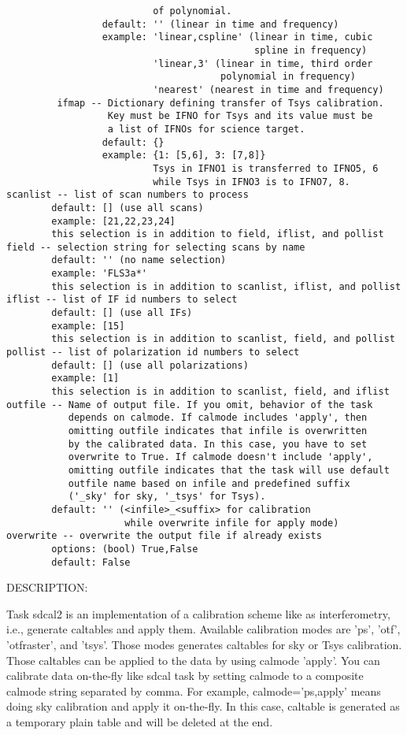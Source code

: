 \begin{verbatim}
                          of polynomial.
                 default: '' (linear in time and frequency)
                 example: 'linear,cspline' (linear in time, cubic 
                                            spline in frequency)
                          'linear,3' (linear in time, third order 
                                      polynomial in frequency)
                          'nearest' (nearest in time and frequency)
         ifmap -- Dictionary defining transfer of Tsys calibration. 
                  Key must be IFNO for Tsys and its value must be 
                  a list of IFNOs for science target.
                 default: {}
                 example: {1: [5,6], 3: [7,8]}
                          Tsys in IFNO1 is transferred to IFNO5, 6 
                          while Tsys in IFNO3 is to IFNO7, 8.
scanlist -- list of scan numbers to process
        default: [] (use all scans)
        example: [21,22,23,24]
        this selection is in addition to field, iflist, and pollist
field -- selection string for selecting scans by name
        default: '' (no name selection)
        example: 'FLS3a*'
        this selection is in addition to scanlist, iflist, and pollist
iflist -- list of IF id numbers to select
        default: [] (use all IFs)
        example: [15]
        this selection is in addition to scanlist, field, and pollist
pollist -- list of polarization id numbers to select
        default: [] (use all polarizations)
        example: [1]
        this selection is in addition to scanlist, field, and iflist
outfile -- Name of output file. If you omit, behavior of the task 
           depends on calmode. If calmode includes 'apply', then 
           omitting outfile indicates that infile is overwritten 
           by the calibrated data. In this case, you have to set 
           overwrite to True. If calmode doesn't include 'apply', 
           omitting outfile indicates that the task will use default 
           outfile name based on infile and predefined suffix 
           ('_sky' for sky, '_tsys' for Tsys).
        default: '' (<infile>_<suffix> for calibration 
                     while overwrite infile for apply mode)
overwrite -- overwrite the output file if already exists
        options: (bool) True,False
        default: False

\end{verbatim}

DESCRIPTION:

Task sdcal2 is an implementation of a calibration scheme like as 
interferometry, i.e., generate caltables and apply them. Available 
calibration modes are 'ps', 'otf', 'otfraster', and 'tsys'. Those 
modes generates caltables for sky or Tsys calibration. Those 
caltables can be applied to the data by using calmode 'apply'. 
You can calibrate data on-the-fly like sdcal task by setting 
calmode to a composite calmode string separated by comma. 
For example, calmode='ps,apply' means doing sky calibration and 
apply it on-the-fly. In this case, caltable is generated as a 
temporary plain table and will be deleted at the end.

